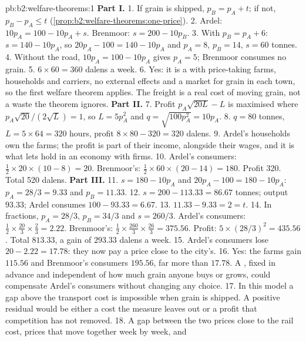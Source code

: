 \begin{solution}{pb:b2:welfare-theorems:1}
\textbf{Part I.}
1. If grain is shipped, $p_B = p_A + t$; if not, $p_B - p_A \le t$ (\cref{prop:b2:welfare-theorems:one-price}).
2. Ardel: $10p_A = 100 - 10p_A + s$. Brenmoor: $s = 200 - 10p_B$.
3. With $p_B = p_A + 6$: $s = 140 - 10p_A$, so $20p_A - 100 = 140 - 10p_A$ and $p_A = 8$, $p_B = 14$, $s =
60$ tonnes.
4. Without the road, $10p_A = 100 - 10p_A$ gives $p_A = 5$; Brenmoor consumes no grain.
5. $6 \times 60 = 360$ dalens a week.
6. Yes: it is a  with price-taking farms, households and carriers, no external
effects and a market for grain in each town, so the first welfare theorem applies. The freight is a real
cost of moving grain, not a waste the theorem ignores.
\textbf{Part II.}
7. Profit $p_A\sqrt{20L} - L$ is maximised where $p_A\sqrt{20}/(2\sqrt L) = 1$, so $L = 5p_A^2$ and $q =
\sqrt{100p_A^2} = 10p_A$.
8. $q = 80$ tonnes, $L = 5 \times 64 = 320$ hours, profit $8 \times 80 - 320 = 320$ dalens.
9. Ardel's households own the farms; the profit is part of their income, alongside their wages, and it is
what lets  hold in an economy with firms.
10. Ardel's consumers: $\tfrac12 \times 20 \times (10 - 8) = 20$. Brenmoor's: $\tfrac12 \times 60 \times (20
- 14) = 180$. Profit 320. Total 520 dalens.
\textbf{Part III.}
11. $s = 180 - 10p_A$ and $20p_A - 100 = 180 - 10p_A$: $p_A = 28/3 = 9.33$ and $p_B = 11.33$.
12. $s = 200 - 113.33 = 86.67$ tonnes; output $93.33$; Ardel consumes $100 - 93.33 = 6.67$.
13. $11.33 - 9.33 = 2 = t$.
14. In fractions, $p_A = 28/3$, $p_B = 34/3$ and $s = 260/3$. Ardel's consumers: $\tfrac12 \times \tfrac{20}{3}
\times \tfrac23 = 2.22$. Brenmoor's: $\tfrac12 \times \tfrac{260}{3} \times \tfrac{26}{3} = 375.56$. Profit:
$5 \times (28/3)^2 = 435.56$. Total $813.33$, a gain of $293.33$ dalens a week.
15. Ardel's consumers lose $20 - 2.22 = 17.78$: they now pay a price close to the city's.
16. Yes: the farms gain $115.56$ and Brenmoor's consumers $195.56$, far more than $17.78$. A , fixed in advance and independent of how much grain anyone buys or grows, could compensate
Ardel's consumers without changing any choice.
17. In this model a gap above the transport cost is impossible when grain is shipped. A positive residual
would be either a cost the measure leaves out or a profit that competition has not removed.
18. A gap between the two prices close to the rail cost, prices that move together week by week, and

\end{solution}
